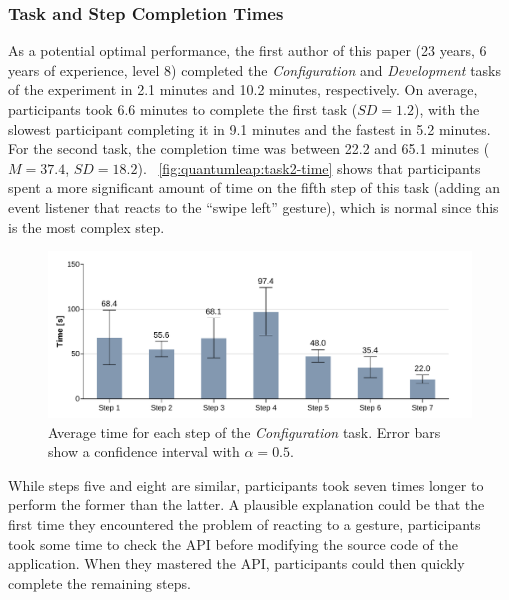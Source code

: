 \subsubsection{Task and Step Completion Times}
As a potential optimal performance, the first author of this paper (23 years, 6 years of experience, level 8)  completed the \textit{Configuration} and \textit{Development} tasks of the experiment in 2.1 minutes and 10.2 minutes, respectively. On average, participants took 6.6 minutes to complete the first task ($SD{=}1.2$), with the slowest participant completing it in 9.1 minutes and the fastest in 5.2 minutes. For the second task, the completion time was between 22.2 and 65.1 minutes ($M{=}37.4$, $SD{=}18.2$). \fig~\ref{fig:quantumleap:task2-time} shows that participants spent a more significant amount of time on the fifth step of this task (\ie adding an event listener that reacts to the ``swipe left'' gesture), which is normal since this is the most complex step.

\begin{figure}[!b]
    \centering
    \includegraphics[width=\linewidth]{Figures/QuantumLeap/Evaluation/Task 1 (time).pdf}
    \caption{Average time for each step of the \textit{Configuration} task. Error bars show a confidence interval with $\alpha{=}0.5$.}
    \label{fig:quantumleap:task1-time}
\end{figure}


While steps five and eight are similar, participants took seven times longer to perform the former than the latter. A plausible explanation could be that the first time they encountered the problem of reacting to a gesture, participants took some time to check the API before modifying the source code of the application. When they mastered the API, participants could then quickly complete the remaining steps.


